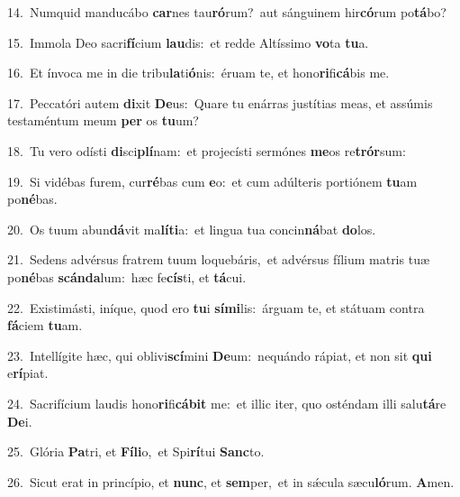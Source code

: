 {\numbfont\textcolor{\numbcolor}{14.}}~Numquid manducábo \textbf{car}\-nes tau\-\textbf{ró}\-rum?~\star aut sánguinem hir\-\textbf{có}\-rum po\-\textbf{tá}\-bo?\par
{\numbfont\textcolor{\numbcolor}{15.}}~Immola Deo sacri\-\textbf{fí}\-cium \textbf{lau}\-dis:~\star et redde Altíssimo \textbf{vo}\-ta \textbf{tu}\-a.\par
{\numbfont\textcolor{\numbcolor}{16.}}~Et ínvoca me in die tribu\-\textbf{la}\-ti\-\textbf{ó}\-nis:~\star éruam te, et hono\-\textbf{ri}\-fi\-\textbf{cá}\-bis me.\par
{\numbfont\textcolor{\numbcolor}{17.}}~Peccatóri autem \textbf{di}\-xit \textbf{De}\-us:~\star Quare tu enárras justítias meas, et assúmis testaméntum meum \textbf{per} os \textbf{tu}\-um?\par
{\numbfont\textcolor{\numbcolor}{18.}}~Tu vero odísti \textbf{di}\-sci\-\textbf{plí}\-nam:~\star et projecísti sermónes \textbf{me}\-os re\-\textbf{trór}\-sum:\par
{\numbfont\textcolor{\numbcolor}{19.}}~Si vidébas furem, cur\-\textbf{ré}\-bas cum \textbf{e}\-o:~\star et cum adúlteris portiónem \textbf{tu}\-am po\-\textbf{né}\-bas.\par
{\numbfont\textcolor{\numbcolor}{20.}}~Os tuum abun\-\textbf{dá}\-vit ma\-\textbf{lí}\-\textbf{ti}a:~\star et lingua tua concin\-\textbf{ná}\-bat \textbf{do}\-los.\par
{\numbfont\textcolor{\numbcolor}{21.}}~Sedens advérsus fratrem tuum loquebáris,~\dagger et advérsus fílium matris tuæ po\-\textbf{né}\-bas \textbf{scán}\-\textbf{da}lum:~\star hæc fe\-\textbf{cís}\-ti, et \textbf{tá}\-cui.\par
{\numbfont\textcolor{\numbcolor}{22.}}~Existimásti, iníque, quod ero \textbf{tu}\-i \textbf{sí}\-\textbf{mi}lis:~\star árguam te, et státuam contra \textbf{fá}\-ciem \textbf{tu}\-am.\par
{\numbfont\textcolor{\numbcolor}{23.}}~Intellígite hæc, qui oblivi\-\textbf{scí}\-mini \textbf{De}\-um:~\star nequándo rápiat, et non sit \textbf{qui} e\-\textbf{rí}\-piat.\par
{\numbfont\textcolor{\numbcolor}{24.}}~Sacrifícium laudis hono\-\textbf{ri}\-fi\-\textbf{cá}\-\textbf{bit} me:~\star et illic iter, quo osténdam illi salu\-\textbf{tá}\-re \textbf{De}\-i.\par
{\numbfont\textcolor{\numbcolor}{25.}}~Glória \textbf{Pa}\-tri, et \textbf{Fí}\-\textbf{li}o,~\star et Spi\-\textbf{rí}\-tui \textbf{Sanc}\-to.\par
{\numbfont\textcolor{\numbcolor}{26.}}~Sicut erat in princípio, et \textbf{nunc}\-, et \textbf{sem}\-per,~\star et in sǽcula sæcu\-\textbf{ló}\-rum. \textbf{A}\-men.\par
